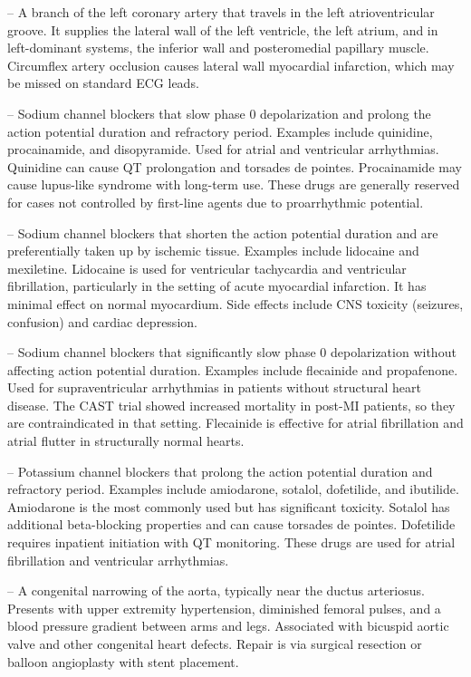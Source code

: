 -- A branch of the left coronary artery that travels in the left atrioventricular groove. It supplies the lateral wall of the left ventricle, the left atrium, and in left-dominant systems, the inferior wall and posteromedial papillary muscle. Circumflex artery occlusion causes lateral wall myocardial infarction, which may be missed on standard ECG leads.

-- Sodium channel blockers that slow phase 0 depolarization and prolong the action potential duration and refractory period. Examples include quinidine, procainamide, and disopyramide. Used for atrial and ventricular arrhythmias. Quinidine can cause QT prolongation and torsades de pointes. Procainamide may cause lupus-like syndrome with long-term use. These drugs are generally reserved for cases not controlled by first-line agents due to proarrhythmic potential.

-- Sodium channel blockers that shorten the action potential duration and are preferentially taken up by ischemic tissue. Examples include lidocaine and mexiletine. Lidocaine is used for ventricular tachycardia and ventricular fibrillation, particularly in the setting of acute myocardial infarction. It has minimal effect on normal myocardium. Side effects include CNS toxicity (seizures, confusion) and cardiac depression.

-- Sodium channel blockers that significantly slow phase 0 depolarization without affecting action potential duration. Examples include flecainide and propafenone. Used for supraventricular arrhythmias in patients without structural heart disease. The CAST trial showed increased mortality in post-MI patients, so they are contraindicated in that setting. Flecainide is effective for atrial fibrillation and atrial flutter in structurally normal hearts.

-- Potassium channel blockers that prolong the action potential duration and refractory period. Examples include amiodarone, sotalol, dofetilide, and ibutilide. Amiodarone is the most commonly used but has significant toxicity. Sotalol has additional beta-blocking properties and can cause torsades de pointes. Dofetilide requires inpatient initiation with QT monitoring. These drugs are used for atrial fibrillation and ventricular arrhythmias.

-- A congenital narrowing of the aorta, typically near the ductus arteriosus. Presents with upper extremity hypertension, diminished femoral pulses, and a blood pressure gradient between arms and legs. Associated with bicuspid aortic valve and other congenital heart defects. Repair is via surgical resection or balloon angioplasty with stent placement.

